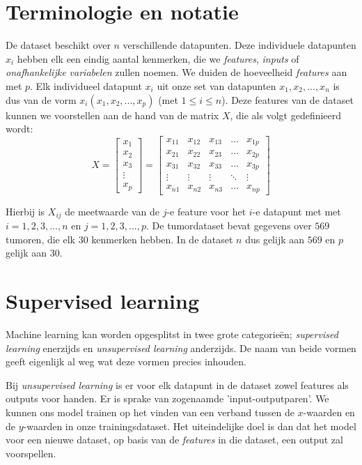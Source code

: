 \documentclass[twoside, kulak]{kulakreport}
\begin{document}
	\section{Terminologie en notatie}
	
	De dataset beschikt over \(n\) verschillende datapunten. Deze individuele datapunten \(x_i\) hebben elk een eindig aantal kenmerken, die we \textit{features}, \textit{inputs} of \textit{onafhankelijke variabelen} zullen noemen. We duiden de hoeveelheid \textit{features} aan met \(p\). Elk individueel datapunt \(x_i\) uit onze set van datapunten \(x_1,x_2,...,x_n\) is dus van de vorm \(x_i(x_1,x_2,...,x_p)\) (met \( 1 \leq i \leq n \)). Deze features van de dataset kunnen we voorstellen aan de hand van de matrix \(X\), die als volgt gedefinieerd wordt: \[X = \left[ 
	\begin{array}{c}
		x_1 \\
		x_2 \\
		x_3 \\
		\vdots \\
		x_p
	\end{array} \right] = \left[ 
	\begin{array}{ccccc}
		x_{11} & x_{12} & x_{13} & \ldots & x_{1p}  \\
		x_{21} & x_{22} & x_{23} & \ldots & x_{2p} \\
		x_{31} & x_{32} & x_{33} & \ldots & x_{3p} \\
		\vdots & \vdots & \vdots & \ddots & \vdots \\
		x_{n1} & x_{n2} & x_{n3} & \ldots & x_{np}
	\end{array}\right]\]
	
	Hierbij is \(X_{ij}\) de meetwaarde van de \(j\)-e feature voor het \(i\)-e datapunt met met \(i=1,2,3,...,n\) en \(j=1,2,3,...,p\). De tumordataset bevat gegevens over \(569\) tumoren, die elk \(30\) kenmerken hebben. In de dataset \(n\) dus gelijk aan \(569\) en \(p\) gelijk aan \(30\).
	
	\section{Supervised learning}
	
	Machine learning kan worden opgesplitst in twee grote categorieën; \textit{supervised learning} enerzijds en \textit{unsupervised learning} anderzijds. De naam van beide vormen geeft eigenlijk al weg wat deze vormen precies inhouden.
	
	Bij \textit{unsupervised learning} is er voor elk datapunt in de dataset zowel features als outputs voor handen. Er is sprake van zogenaamde 'input-outputparen'. We kunnen ons model trainen op het vinden van een verband tussen de \(x\)-waarden en de \(y\)-waarden in onze trainingsdataset. Het uiteindelijke doel is dan dat het model voor een nieuwe dataset, op basis van de \textit{features} in die dataset, een output zal voorspellen.
	
\end{document}
